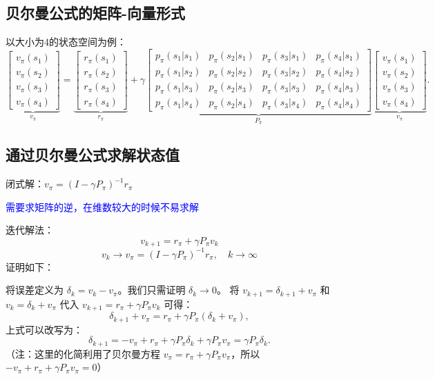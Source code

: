 \documentclass{article}
\begin{document}
\subsection{贝尔曼公式的矩阵-向量形式}
以大小为4的状态空间为例：
\[
\underbrace{
  \begin{bmatrix}
    v_{\pi}(s_1) \\
    v_{\pi}(s_2) \\
    v_{\pi}(s_3) \\
    v_{\pi}(s_4)
  \end{bmatrix}
}_{v_{\pi}}
=
\underbrace{
  \begin{bmatrix}
    r_{\pi}(s_1) \\
    r_{\pi}(s_2) \\
    r_{\pi}(s_3) \\
    r_{\pi}(s_4)
  \end{bmatrix}
}_{r_{\pi}}
+ \gamma
\underbrace{
  \begin{bmatrix}
    p_{\pi}(s_1|s_1) & p_{\pi}(s_2|s_1) & p_{\pi}(s_3|s_1) & p_{\pi}(s_4|s_1) \\
    p_{\pi}(s_1|s_2) & p_{\pi}(s_2|s_2) & p_{\pi}(s_3|s_2) & p_{\pi}(s_4|s_2) \\
    p_{\pi}(s_1|s_3) & p_{\pi}(s_2|s_3) & p_{\pi}(s_3|s_3) & p_{\pi}(s_4|s_3) \\
    p_{\pi}(s_1|s_4) & p_{\pi}(s_2|s_4) & p_{\pi}(s_3|s_4) & p_{\pi}(s_4|s_4)
  \end{bmatrix}
}_{P_{\pi}}
\underbrace{
  \begin{bmatrix}
    v_{\pi}(s_1) \\
    v_{\pi}(s_2) \\
    v_{\pi}(s_3) \\
    v_{\pi}(s_4)
  \end{bmatrix}
}_{v_{\pi}}.
\]
\subsection{通过贝尔曼公式求解状态值}
闭式解：$v_{\pi} = (I - \gamma P_{\pi})^{-1} r_{\pi}$

\textcolor{blue}{\kaishu*需要求矩阵的逆，在维数较大的时候不易求解}

迭代解法：
$$v_{k+1} = r_{\pi} + \gamma P_{\pi} v_k$$
$$v_k \to v_{\pi} = (I - \gamma P_{\pi})^{-1} r_{\pi}, \quad k \to \infty$$
{\kaishu*证明如下：}

将误差定义为 $\delta_k = v_k - v_{\pi}$。我们只需证明 $\delta_k \to 0$。
将 $v_{k+1} = \delta_{k+1} + v_{\pi}$ 和 $v_k = \delta_k + v_{\pi}$ 代入 $v_{k+1} = r_{\pi} + \gamma P_{\pi} v_k$ 可得：
\[
\delta_{k+1} + v_{\pi} = r_{\pi} + \gamma P_{\pi}(\delta_k + v_{\pi}),
\]
上式可以改写为：
\[
\delta_{k+1} = -v_{\pi} + r_{\pi} + \gamma P_{\pi} \delta_k + \gamma P_{\pi} v_{\pi} = \gamma P_{\pi} \delta_k.
\]
（注：这里的化简利用了贝尔曼方程 $v_{\pi} = r_{\pi} + \gamma P_{\pi} v_{\pi}$，所以 $-v_{\pi} + r_{\pi} + \gamma P_{\pi} v_{\pi} = 0$）
\end{document}
